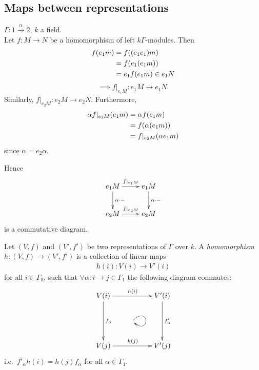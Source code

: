 \subsection{Maps between representations}
\begin{exam}
\(\Gamma\colon 1\xrightarrow{\alpha}2\), \(k\) a field.\\
Let \(f\colon M\xrightarrow{}N\) be a homomorphism of left \(k\Gamma\)-modules. Then
\begin{align}
f(e_1m)  & = f((e_1e_1)m) \notag\\
              & = f(e_1(e_1m)) \notag\\
              & = e_1f(e_1m) \in e_1N\notag
\end{align}
\[\implies f|_{e_1M}:e_1M \to e_1N.\]
Similarly, \(f|_{e_2M}\colon e_2M\xrightarrow{}e_2N\). Furthermore,
\begin{align}
     \alpha f|_{e_1M}(e_1m) & = \alpha f(e_1m)\notag\\
                                       & = f(\alpha(e_1m)) \notag\\
                                       & = f|_{e_2M}(\alpha e_1m)\notag
\end{align}
since $\alpha = e_2\alpha$. 
\end{exam}
\noindent Hence
\[\xymatrix{e_1M\ar[r]^{f|_{e_1M}}\ar[d]^{\alpha\cdot-} & e_1M\ar[d]^{\alpha\cdot\Large-} \\
    e_2M\ar[r]^{f|_{e_2M}} & e_2M}\]
is a commutative diagram. 
\begin{defin}
Let \((V, f)\) and \((V', f')\) be two representations of \(\Gamma\)
over \(k\). A \emph{homomorphism}
\(h:(V, f)\to  (V', f')\) is a collection of linear maps 
\begin{align*}
    h(i)\colon V(i) \to  V'(i)
\end{align*}
for all \(i\in\Gamma_0\), such that \(\forall\alpha :i\to  j\in\Gamma_1\) the following diagram commutes:
\begin{align*}
  \xymatrix{V(i)\ar[rr]^{h(i)}\ar[dd]^{f_\alpha} & & V'(i)\ar[dd]^{f'_\alpha} \\
 & \ar@(ur,dr) & \\
 V(j)\ar[rr]^{h(j)}& & V'(j)}  
\end{align*}
i.e.\ \(f'_\alpha h(i) = h(j)f_\alpha\) for all \(\alpha\in\Gamma_1\). 
\end{defin}

